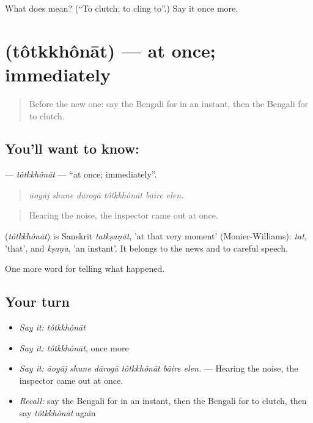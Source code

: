 \begin{tcolorbox}[breakable,colback=teal!4,colframe=teal!35!black,title={Before you move on}]
What does   mean? (\textquotedblleft{}To clutch; to cling to\textquotedblright{}.) Say it once more.
\end{tcolorbox}
\section[\texorpdfstring{\bn{তৎক্ষণাৎ} (tôtkkhônāt)}{তৎক্ষণাৎ (tôtkkhônāt)}]{ (tôtkkhônāt) — at once; immediately}

\label{lesson:BN-C287-totkkhonat}



\begin{quote}
Before the new one: say the Bengali for in an instant, then the Bengali for to clutch.
\end{quote}

\subsection*{You'll want to know: }
\textbf{} — \emph{tôtkkhônāt} — \textquotedblleft{}at once; immediately\textquotedblright{}.

\begin{quote}
     
\end{quote}

\begin{quote}
\emph{āoyāj shune dārogā tôtkkhônāt bāire elen.}
\end{quote}

\begin{quote}
Hearing the noise, the inspector came out at once.
\end{quote}

\begin{cousinweb}
\textbf{} (\emph{tôtkkhônāt}) is Sanskrit \emph{tatkṣaṇāt}, 'at that very moment' (Monier-Williams): \emph{tat}, 'that', and \emph{kṣaṇa}, 'an instant'. It belongs to the news and to careful speech.
\end{cousinweb}

\begin{grammarlens}[title={What you've built}]
One more word for telling what happened.
\end{grammarlens}

\subsection*{Your turn}
\begin{itemize}
\raggedright
  \item \emph{Say it:} \emph{tôtkkhônāt}
  \item \emph{Say it:} \emph{tôtkkhônāt}, once more
  \item \emph{Say it:} \emph{āoyāj shune dārogā tôtkkhônāt bāire elen.} — Hearing the noise, the inspector came out at once.
  \item \emph{Recall:} say the Bengali for in an instant, then the Bengali for to clutch, then say \emph{tôtkkhônāt} again
\end{itemize}

